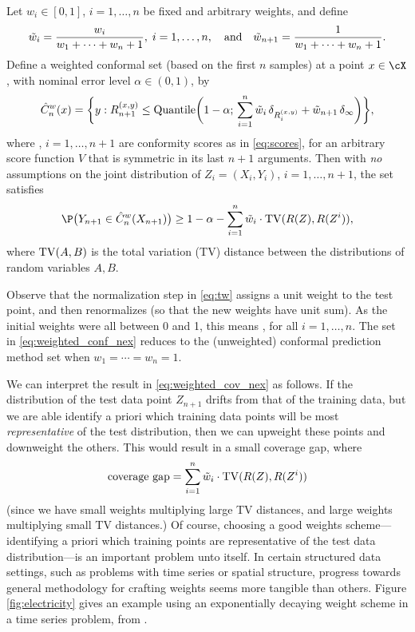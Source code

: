 \documentclass{article}
\begin{document}
\begin{theorem}
\label{thm:weighted_conf_nex}
Let $w_i \in [0,1]$, $i=1,\dots,n$ be fixed and arbitrary weights, and define 
\begin{equation}
\label{eq:tw}
\tilde{w}_i = \frac{w_i}{w_1 + \cdots + w_n + 1}, \; i=1,\ldots,n, 
\quad \text{and} \quad 
\tilde{w}_{n+1} = \frac{1}{w_1 + \cdots + w_n + 1}.
\end{equation}
Define a weighted conformal set (based on the first $n$ samples) at a point
$x \in \cX$, with nominal error level $\alpha \in (0,1)$, by   
\begin{equation}
\label{eq:weighted_conf_nex}
\hat{C}^w_n(x) = \bigg\{ y : R_{n+1}^{(x,y)} \leq \mathrm{Quantile}\bigg( 1-\alpha; 
\, \sum_{i=1}^n \tilde{w}_i \, \delta_{R_i^{(x,y)}} + \tilde{w}_{n+1} \, \delta_\infty
\bigg) \bigg\},   
\end{equation}
where , $i=1,\ldots,n+1$ are conformity scores as in
\eqref{eq:scores}, for an arbitrary score function $V$ that is symmetric in its
last $n+1$ arguments. Then with \emph{no} assumptions on the joint distribution
of $Z_i=(X_i,Y_i)$, $i=1,\dots,n+1$, the set  satisfies
\begin{equation}
\label{eq:weighted_cov_nex}
\P\big( Y_{n+1} \in \hC^w_n(X_{n+1}) \big) \geq 1-\alpha - \sum_{i=1}^n 
\tw_i \cdot \TV(R(Z), R(Z^i)),
\end{equation}
where $\mathrm{TV}(A,B)$ is the total variation (TV) distance between the distributions
of random variables $A,B$.  
\end{theorem}

Observe that the normalization step in \eqref{eq:tw} assigns a unit weight to 
the test point, and then renormalizes (so that the new weights have unit
sum). As the initial weights were all between 0 and 1, this means
, for all $i=1,\dots,n$. The set in
\eqref{eq:weighted_conf_nex} reduces to the (unweighted) conformal prediction
method set when $w_1 = \cdots = w_n = 1$.  

We can interpret the result in \eqref{eq:weighted_cov_nex} as follows. If the
distribution of the test data point $Z_{n+1}$ drifts from that of the training
data, but we are able identify a priori which training data points will be most
\emph{representative} of the test distribution, then we can upweight these
points and downweight the others. This would result in a small coverage gap, 
where  
\begin{equation}
\label{eq:coverage_gap}
\text{coverage gap} = \sum_{i=1}^n \tilde{w}_i \cdot \mathrm{TV}(R(Z), R(Z^i))
\end{equation}
(since we have small weights multiplying large TV distances, and large weights 
multiplying small TV distances.) Of course, choosing a good weights
scheme---identifying a priori which training points are representative of the
test data distribution---is an important problem unto itself. In certain
structured data settings, such as problems with time series or spatial
structure, progress towards general methodology for crafting weights seems more
tangible than others. Figure \ref{fig:electricity} gives an example using an
exponentially decaying weight scheme in a time series problem, from
\citet{barber2022conformal}.  
\end{document}
